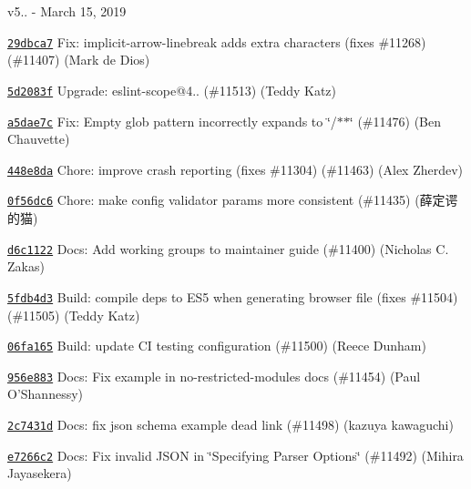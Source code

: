 v5.. -\/ March 15, 2019


\begin{DoxyItemize}
\item \href{https://github.com/eslint/eslint/commit/29dbca73d762a809adb2f457b527e144426d54a7}{\texttt{ {\ttfamily 29dbca7}}} Fix\+: implicit-\/arrow-\/linebreak adds extra characters (fixes \#11268) (\#11407) (Mark de Dios)
\item \href{https://github.com/eslint/eslint/commit/5d2083fa3e14c024197f6c386ff72237a145e258}{\texttt{ {\ttfamily 5d2083f}}} Upgrade\+: eslint-\/scope@4.. (\#11513) (Teddy Katz)
\item \href{https://github.com/eslint/eslint/commit/a5dae7c3d30231c2f5f075d98c2c8825899bab16}{\texttt{ {\ttfamily a5dae7c}}} Fix\+: Empty glob pattern incorrectly expands to \char`\"{}/$\ast$$\ast$\char`\"{} (\#11476) (Ben Chauvette)
\item \href{https://github.com/eslint/eslint/commit/448e8da94d09b397e98ffcb6f22b55a578ef79c1}{\texttt{ {\ttfamily 448e8da}}} Chore\+: improve crash reporting (fixes \#11304) (\#11463) (Alex Zherdev)
\item \href{https://github.com/eslint/eslint/commit/0f56dc6d9eadad05dc3d5c9d1d9ddef94e10c5d3}{\texttt{ {\ttfamily 0f56dc6}}} Chore\+: make config validator params more consistent (\#11435) (薛定谔的猫)
\item \href{https://github.com/eslint/eslint/commit/d6c112289f0f16ade070865c8786831b7940ca79}{\texttt{ {\ttfamily d6c1122}}} Docs\+: Add working groups to maintainer guide (\#11400) (Nicholas C. Zakas)
\item \href{https://github.com/eslint/eslint/commit/5fdb4d3fb01b9d8a4c2dff71ed9cddb2f8feefb0}{\texttt{ {\ttfamily 5fdb4d3}}} Build\+: compile deps to E\+S5 when generating browser file (fixes \#11504) (\#11505) (Teddy Katz)
\item \href{https://github.com/eslint/eslint/commit/06fa1655c3da8394ed9144d727115fc434b0416f}{\texttt{ {\ttfamily 06fa165}}} Build\+: update CI testing configuration (\#11500) (Reece Dunham)
\item \href{https://github.com/eslint/eslint/commit/956e883c21fd9f393bf6718d032a4e2e53b33f22}{\texttt{ {\ttfamily 956e883}}} Docs\+: Fix example in no-\/restricted-\/modules docs (\#11454) (Paul O’\+Shannessy)
\item \href{https://github.com/eslint/eslint/commit/2c7431d6b32063f74e3837ee727f26af215eada7}{\texttt{ {\ttfamily 2c7431d}}} Docs\+: fix json schema example dead link (\#11498) (kazuya kawaguchi)
\item \href{https://github.com/eslint/eslint/commit/e7266c2478aff5d66e7859313feb49e3a129f85e}{\texttt{ {\ttfamily e7266c2}}} Docs\+: Fix invalid J\+S\+ON in \char`\"{}\+Specifying Parser Options\char`\"{} (\#11492) (Mihira Jayasekera)
$$
\end{DoxyItemize}
